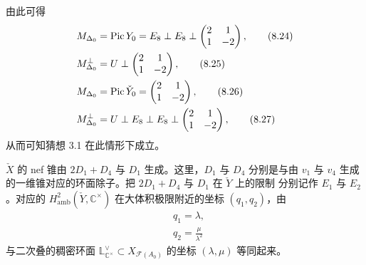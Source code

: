

由此可得
\begin{align}
  & M_{\Delta_0} = \operatorname{Pic} Y_0 = E_8\perp E_8\perp
    \begin{pmatrix} 2 & 1 \\ 1 & -2 \end{pmatrix}, \tag{8.24}\\
  & M_{\Delta_0}^{\perp} = U\perp
    \begin{pmatrix} 2 & 1 \\ 1 & -2 \end{pmatrix}, \tag{8.25}\\
  & M_{\Delta_0} = \operatorname{Pic}\check{Y}_0 =
    \begin{pmatrix} 2 & 1 \\ 1 & -2 \end{pmatrix}, \tag{8.26}\\
  & M_{\Delta_0}^{\perp} = U\perp E_8\perp E_8\perp
    \begin{pmatrix} 2 & 1 \\ 1 & -2 \end{pmatrix}, \tag{8.27}
\end{align}
从而可知猜想 3.1 在此情形下成立。


$\check{X}$ 的 nef 锥由 $2D_1+D_4$ 与 $D_1$ 生成。这里，$D_1$ 与 $D_4$ 分别是与由
$v_1$ 与 $v_4$ 生成的一维锥对应的环面除子。把 $2D_1+D_4$ 与 $D_1$ 在 $\check{Y}$ 上的限制
分别记作 $E_1$ 与 $E_2$。对应的 $H^{2}_{\mathrm{amb}}(\check{Y},\mathbb{C}^{\times})$
在大体积极限附近的坐标 $(q_1,q_2)$，由
\begin{align}
  & q_1=\lambda, \tag{8.28}\\
  & q_2=\frac{\mu}{\lambda^{2}} \tag{8.29}
\end{align}
与二次叠的稠密环面 $\mathbb{L}^{\vee}_{\mathbb{C}^{\times}}\subset X_{\mathcal{F}(A_0)}$
的坐标 $(\lambda,\mu)$ 等同起来。

